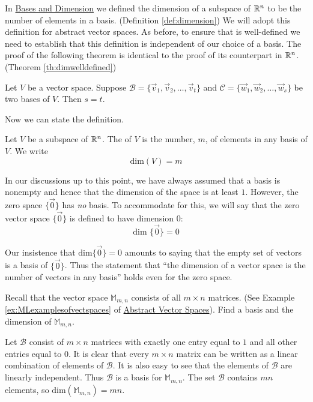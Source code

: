 \documentclass{ximera}
\begin{document}
In \href{https://ximera.osu.edu/oerlinalg/LinearAlgebra/VSP-0035/main}{Bases and Dimension} we defined the dimension of a subspace of $\mathbb{R}^n$ to be the number of elements in a basis. (Definition \ref{def:dimension})  We will adopt this definition for abstract vector spaces.  As before, to ensure that  is well-defined we need to establish that this definition is independent of our choice of a basis.  The proof of the following theorem is identical to the proof of its counterpart in $\mathbb{R}^n$.  (Theorem \ref{th:dimwelldefined})

\begin{theorem}\label{th:dimwelldefinedabstract}
Let $V$ be a vector space.  Suppose $\mathcal{B}=\{\vec{v}_1, \vec{v}_2,\ldots ,\vec{v}_t\}$ and $\mathcal{C}=\{\vec{w}_1, \vec{w}_2,\ldots ,\vec{w}_s\}$ be two bases of $V$.  Then $s=t$.
\end{theorem}
Now we can state the definition.
\begin{definition}\label{def:dimensionabstract}
Let $V$ be a subspace of $\mathbb{R}^n$.  The  of $V$ is the number, $m$, of elements in any basis of $V$.  We write
$$\mbox{dim}(V)=m$$
\end{definition}

In our discussions up to this point, we have always assumed that a basis is nonempty and hence that the dimension of the space is at least $1$. However, the zero space $\{\vec{0}\}$ has {\it no} basis.  To accommodate for this, we will say that the zero vector space $\{\vec{0}\}$ is defined to have dimension $0$:
\begin{equation*}
\mbox{dim }\{\vec{0}\} = 0
\end{equation*}

Our insistence that $\mbox{dim}\{\vec{0}\} = 0$ amounts to saying that the empty set of vectors is a basis of $\{\vec{0}\}$. Thus the statement that ``the dimension of a vector space is the number of vectors in any basis'' holds even for the zero space. 

\begin{example}\label{ex:dimofM}
Recall that the vector space $\mathbb{M}_{m,n}$ consists of all $m\times n$ matrices. (See Example \ref{ex:MLexamplesofvectspaces} of \href{https://ximera.osu.edu/oerlinalg/LinearAlgebra/VSP-0050/main}{Abstract Vector Spaces}).  Find a basis and the dimension of $\mathbb{M}_{m,n}$.
\begin{explanation}
Let $\mathcal{B}$ consist of $m\times n$ matrices 
 with exactly one entry equal to $1$ and all other entries equal to $0$. It is clear that every $m\times n$ matrix can be written as a linear combination of elements of $\mathcal{B}$.  It is also easy to see that the elements of $\mathcal{B}$ are linearly independent.  Thus $\mathcal{B}$ is a basis for $\mathbb{M}_{m,n}$.  The set $\mathcal{B}$ contains $mn$ elements, so $\mbox{dim}(\mathbb{M}_{m,n})=mn$.
\end{explanation}
\end{example}
\end{document}
